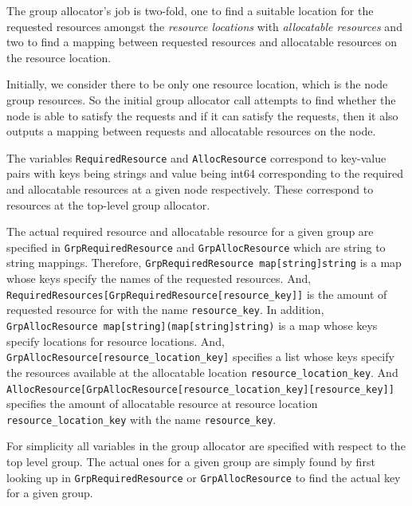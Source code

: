 \documentclass[12pt,onecolumn]{IEEEtran}
\newcommand{\bus}{\_\allowbreak}
\begin{document}
The group allocator's job is two-fold, one to find a suitable
location for the requested resources amongst the {\em resource locations}
with {\em allocatable resources} and two to find a mapping between
requested resources and allocatable resources on the resource location.

Initially, we consider there to be only one resource location,
which is the node group resources.
So the initial group allocator call attempts to find whether
the node is able to satisfy the requests and if it can satisfy the
requests, then it also outputs a mapping between requests and allocatable
resources on the node.

The variables \texttt{RequiredResource} and \texttt{AllocResource}
correspond to key-value pairs with keys being strings and value being
int64 corresponding to the required and allocatable resources at a given node
respectively.
These correspond to resources at the top-level group allocator.

The actual required resource and allocatable resource for a given group
are specified in
\texttt{GrpRequiredResource} and \texttt{GrpAllocResource} which 
are string to string mappings.
Therefore, 
\texttt{GrpRequiredResource map[string]string}
is a map whose keys specify the names of the requested resources.
And, \texttt{RequiredResources[GrpRequiredResource[resource{\bus}key]]} is the
amount of requested resource for with the name \texttt{resource{\bus}key}.
In addition, \texttt{GrpAllocResource map[string](map[string]string)}
is a map whose keys specify locations for resource locations.
And, \texttt{GrpAllocResource[resource{\bus}location{\bus}key]} specifies a list
whose keys specify the resources available at the allocatable location
\texttt{resource{\bus}location{\bus}key}.
And 
\texttt{AllocResource[GrpAllocResource[resource{\bus}location{\bus}key][resource{\bus}key]]}
specifies the amount of allocatable resource at resource location
\texttt{resource{\bus}location{\bus}key} with the name \texttt{resource{\bus}key}.

For simplicity all variables in the group allocator are specified with
respect to the top level group.
The actual ones for a given group are simply found
by first looking up in
\texttt{GrpRequiredResource} or \texttt{GrpAllocResource} to find
the actual key for a given group.
\end{document}
